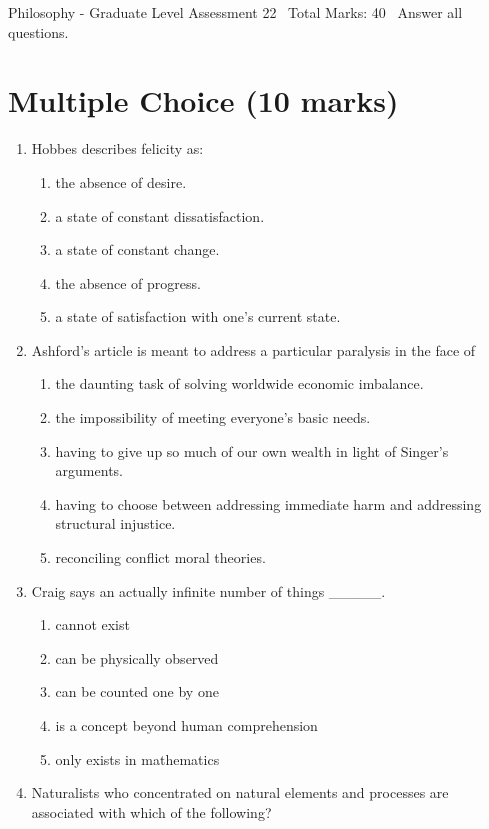 \documentclass[12pt]{article}
\begin{document}
\begin{center}
Philosophy - Graduate Level Assessment 22 \
Total Marks: 40 \
Answer all questions.
\end{center}

\section*{Multiple Choice (10 marks)}
\begin{enumerate}[label=\arabic*.]
\item Hobbes describes felicity as:
\begin{enumerate}[label=(\alph*)]
    \item the absence of desire.
    \item a state of constant dissatisfaction.
    \item a state of constant change.
    \item the absence of progress.
    \item a state of satisfaction with one's current state.
\end{enumerate}
\item Ashford's article is meant to address a particular paralysis in the face of
\begin{enumerate}[label=(\alph*)]
    \item the daunting task of solving worldwide economic imbalance.
    \item the impossibility of meeting everyone's basic needs.
    \item having to give up so much of our own wealth in light of Singer's arguments.
    \item having to choose between addressing immediate harm and addressing structural injustice.
    \item reconciling conflict moral theories.
\end{enumerate}
\item Craig says an actually infinite number of things \_\_\_\_\_.
\begin{enumerate}[label=(\alph*)]
    \item cannot exist
    \item can be physically observed
    \item can be counted one by one
    \item is a concept beyond human comprehension
    \item only exists in mathematics
\end{enumerate}
\item Naturalists who concentrated on natural elements and processes are associated with which of the following?

\end{enumerate}
\end{document}
